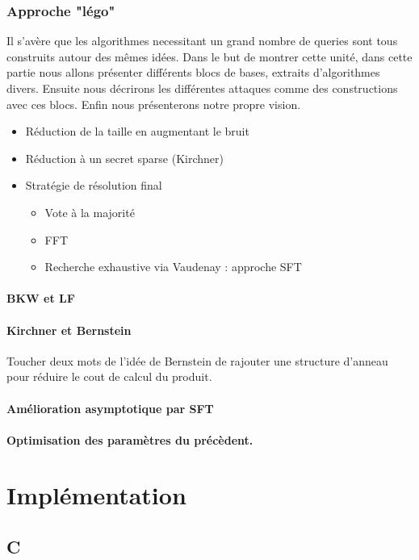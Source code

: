 \documentclass{article}		%
\begin{document}
\subsubsection{Approche "légo"}
Il s'avère que les algorithmes  necessitant un grand nombre
de queries sont tous construits autour des mêmes idées. Dans le but de
montrer cette unité, dans cette partie nous allons présenter différents
blocs de bases, extraits d'algorithmes divers. Ensuite nous décrirons les
différentes attaques comme des constructions avec ces blocs. Enfin nous
présenterons notre propre vision.  
\begin{itemize}
\item Réduction de la taille en augmentant le bruit
\item Réduction à un secret sparse (Kirchner)
\item Stratégie de résolution final
\begin{itemize}
\item Vote à la majorité
\item FFT
\item Recherche exhaustive via Vaudenay : approche SFT \label{SFT}
\end{itemize} 
\end{itemize}

\paragraph{BKW et LF}

\paragraph{Kirchner et Bernstein}
 Toucher deux mots de l'idée de Bernstein de rajouter une structure
d'anneau pour réduire le cout de calcul du produit.

\paragraph{Amélioration asymptotique par SFT}

\paragraph{Optimisation des paramètres du précèdent.}


\section{Implémentation}
\subsection{C}
\end{document}
